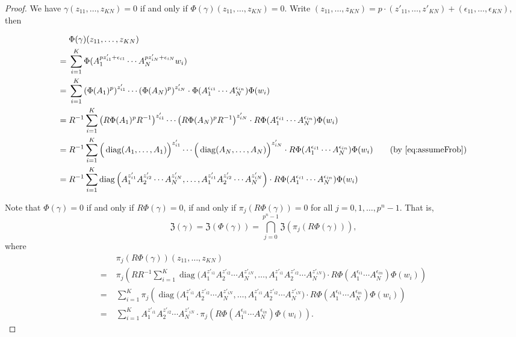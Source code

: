 \documentclass[letterpaper, 11pt, thm-restate]{article}
\numberwithin{equation}{section}
\newcommand{\diag}{\operatorname{diag}}
\newcommand{\mZ}{\mathfrak{Z}}
\theoremstyle{definition}
\theoremstyle{definition}
\theoremstyle{definition}
\begin{document}
\begin{proof}
    We have $\gamma(z_{11}, \ldots, z_{KN}) = 0$ if and only if $\Phi(\gamma)(z_{11}, \ldots, z_{KN}) = 0$.
    Write $(z_{11}, \ldots, z_{KN}) = p \cdot (z'_{11}, \ldots, z'_{KN}) + (\epsilon_{11}, \ldots, \epsilon_{KN})$, then
    
    \begin{align*}
    & \; \Phi(\gamma)(z_{11}, \ldots, z_{KN}) \\
    = & \; \sum_{i=1}^K \Phi(A_1^{pz'_{i1} + \epsilon_{i1}} \cdots A_N^{pz'_{iN} + \epsilon_{iN}} w_i) \\
    = & \; \sum_{i=1}^K \left(\Phi(A_1)^p\right)^{z'_{i1}} \cdots \left(\Phi(A_N)^p\right)^{z'_{iN}} \cdot \Phi(A_1^{\epsilon_{i1}} \cdots A_N^{\epsilon_{in}}) \Phi(w_i) \\
    = & \; R^{-1} \sum_{i=1}^K \left(R \Phi(A_1)^p R^{-1}\right)^{z'_{i1}} \cdots \left(R \Phi(A_N)^p R^{-1}\right)^{z'_{iN}} \cdot R \Phi(A_1^{\epsilon_{i1}} \cdots A_N^{\epsilon_{in}}) \Phi(w_i) \\
    = & \; R^{-1} \sum_{i=1}^K \Big(\diag(A_1, \ldots, A_1)\Big)^{z'_{i1}} \cdots \Big(\diag(A_N, \ldots, A_N)\Big)^{z'_{iN}} \cdot R \Phi(A_1^{\epsilon_{i1}} \cdots A_N^{\epsilon_{in}}) \Phi(w_i) \quad \quad (\text{by \eqref{eq:assumeFrob}})\\
    = & \; R^{-1} \sum_{i=1}^K \diag\Big(A_1^{z'_{i1}} A_2^{z'_{i2}} \cdots A_N^{z'_{iN}}, \ldots, A_1^{z'_{i1}} A_2^{z'_{i2}} \cdots A_N^{z'_{iN}}\Big) \cdot R \Phi(A_1^{\epsilon_{i1}} \cdots A_N^{\epsilon_{in}}) \Phi(w_i)
    \end{align*}

    Note that $\Phi(\gamma) = 0$ if and only if $R\Phi(\gamma) = 0$, if and only if $\pi_j(R \Phi(\gamma)) = 0$ for all $j = 0, 1, \ldots, p^n-1$.
    That is,
    \[
    \mZ(\gamma) = \mZ(\Phi(\gamma)) = \bigcap_{j = 0}^{p^n - 1}\mZ(\pi_j(R \Phi(\gamma))),
    \]
    where
    \begin{align*}
    & \; \pi_j(R \Phi(\gamma))(z_{11}, \ldots, z_{KN}) \\
    = & \; \pi_j \left(R R^{-1}\sum_{i=1}^K \diag\Big(A_1^{z'_{i1}} A_2^{z'_{i2}} \cdots A_N^{z'_{iN}}, \ldots, A_1^{z'_{i1}} A_2^{z'_{i2}} \cdots A_N^{z'_{iN}}\Big) \cdot R \Phi(A_1^{\epsilon_{i1}} \cdots A_N^{\epsilon_{in}}) \Phi(w_i) \right) \\
    = & \; \sum_{i=1}^K \pi_j \left(\diag\Big(A_1^{z'_{i1}} A_2^{z'_{i2}} \cdots A_N^{z'_{iN}}, \ldots, A_1^{z'_{i1}} A_2^{z'_{i2}} \cdots A_N^{z'_{iN}}\Big) \cdot R \Phi(A_1^{\epsilon_{i1}} \cdots A_N^{\epsilon_{in}}) \Phi(w_i)\right)\\
    = & \; \sum_{i=1}^K A_1^{z'_{i1}} A_2^{z'_{i2}} \cdots A_N^{z'_{iN}} \cdot \pi_j\left(R\Phi(A_1^{\epsilon_{i1}} \cdots A_N^{\epsilon_{in}}) \Phi(w_i)\right).
    \end{align*}


\end{proof}
\end{document}
